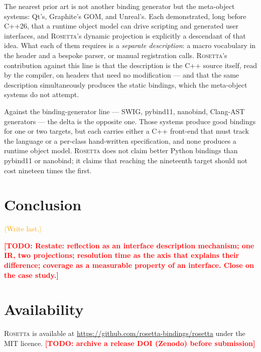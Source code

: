 \documentclass[11pt,a4paper]{article}
\newcommand{\todo}[1]{\textcolor{red}{\textbf{[TODO: #1]}}}
\newcommand{\gap}[1]{\textcolor{orange}{\textsf{\small$\langle$#1$\rangle$}}}
\newcommand{\rosetta}{\textsc{Rosetta}}
\begin{document}
The nearest prior art is not another binding generator but the meta-object
systems: Qt's, Graphite's GOM, and Unreal's. Each demonstrated, long before
C++26, that a runtime object model can drive scripting and generated user
interfaces, and \rosetta's dynamic projection is explicitly a descendant of that
idea. What each of them requires is a \emph{separate description}: a macro
vocabulary in the header and a bespoke parser, or manual registration calls.
\rosetta's contribution against this line is that the description is the C++
source itself, read by the compiler, on headers that need no modification --- and
that the same description simultaneously produces the static bindings, which the
meta-object systems do not attempt.

Against the binding-generator line --- SWIG, pybind11, nanobind, Clang-AST
generators --- the delta is the opposite one. Those systems produce good
bindings for one or two targets, but each carries either a C++ front-end that
must track the language or a per-class hand-written specification, and none
produces a runtime object model. \rosetta{} does not claim better Python
bindings than pybind11 or nanobind; it claims that reaching the nineteenth target should not
cost nineteen times the first.

\section{Conclusion}
\label{sec:conclusion}

\gap{Write last.}

\todo{Restate: reflection as an interface description mechanism; one IR, two
projections; resolution time as the axis that explains their difference;
coverage as a measurable property of an interface. Close on the case study.}

\section*{Availability}
\rosetta{} is available at \url{https://github.com/rosetta-bindings/rosetta}
under the MIT licence. \todo{archive a release DOI (Zenodo) before submission}



\end{document}
